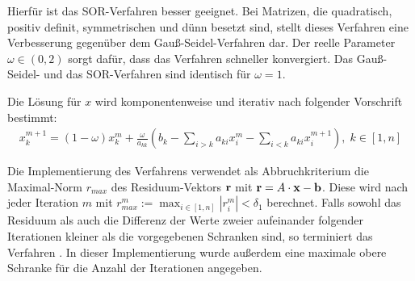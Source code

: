 Hierfür ist das \gls{SOR}-Verfahren besser geeignet. Bei Matrizen, die quadratisch, positiv definit, symmetrischen und dünn besetzt sind, stellt dieses Verfahren eine Verbesserung gegenüber dem Gauß-Seidel-Verfahren dar. Der reelle Parameter $\omega \in (0,2)$ sorgt dafür, dass das Verfahren schneller konvergiert. Das Gauß-Seidel- und das \gls{SOR}-Verfahren sind identisch für $\omega = 1 $.

Die Lösung für $x$ wird komponentenweise und iterativ nach folgender Vorschrift bestimmt:
\begin{align}
x_k^{m+1} = (1-\omega)x_k^m+ \frac{\omega}{a_{kk}}(b_k - \sum_{i>k} a_{ki}x_i^m - \sum_{i<k} a_{ki}x_{i}^{m+1}) ,\; k \in [1, n]
\end{align}

Die Implementierung des Verfahrens verwendet als Abbruchkriterium die Maximal-Norm $r_{max}$ des Residuum-Vektors $\mathbf r$ mit $\mathbf r = A \cdot \mathbf x - \mathbf b$. Diese wird nach jeder Iteration $m$ mit $r_{max}^m := \max_{i\in [1,n]} |r_i^m| < \delta_1$ berechnet. Falls sowohl das Residuum  als auch die Differenz der Werte zweier aufeinander folgender Iterationen kleiner als die vorgegebenen Schranken sind, so terminiert das Verfahren \cite[S. 143]{Westermann2008}. In dieser Implementierung wurde außerdem eine maximale obere Schranke für die Anzahl der Iterationen angegeben.


